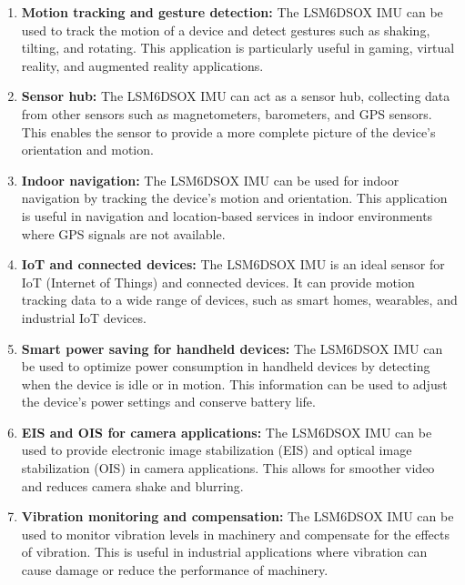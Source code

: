 \begin{enumerate}
    \item \textbf{Motion tracking and gesture detection:} The LSM6DSOX IMU can be used to track the motion of a device and detect gestures such as shaking, tilting, and rotating. This application is particularly useful in gaming, virtual reality, and augmented reality applications.

    \item \textbf{Sensor hub:} The LSM6DSOX IMU can act as a sensor hub, collecting data from other sensors such as magnetometers, barometers, and GPS sensors. This enables the sensor to provide a more complete picture of the device's orientation and motion.\cite{Stefanicka:2017}

    \item \textbf{Indoor navigation:} The LSM6DSOX IMU can be used for indoor navigation by tracking the device's motion and orientation. This application is useful in navigation and location-based services in indoor environments where GPS signals are not available.

    \item \textbf{IoT and connected devices:} The LSM6DSOX IMU is an ideal sensor for IoT (Internet of Things) and connected devices. It can provide motion tracking data to a wide range of devices, such as smart homes, wearables, and industrial IoT devices.\cite{Tripathy:2022}

    \item \textbf{Smart power saving for handheld devices:} The LSM6DSOX IMU can be used to optimize power consumption in handheld devices by detecting when the device is idle or in motion. This information can be used to adjust the device's power settings and conserve battery life.

    \item \textbf{EIS and OIS for camera applications:} The LSM6DSOX IMU can be used to provide electronic image stabilization (EIS) and optical image stabilization (OIS) in camera applications. This allows for smoother video and reduces camera shake and blurring.

    \item \textbf{Vibration monitoring and compensation:} The LSM6DSOX IMU can be used to monitor vibration levels in machinery and compensate for the effects of vibration. This is useful in industrial applications where vibration can cause damage or reduce the performance of machinery.
\end{enumerate}



